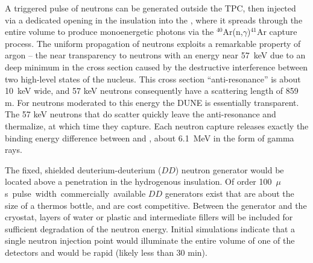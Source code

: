 A triggered pulse of neutrons can be generated outside the TPC, then injected via a dedicated opening in the insulation into the , where it spreads through the entire volume to produce monoenergetic photons via the $^{40}$Ar(n,$\gamma$)$^{41}$Ar capture process. The uniform propagation of neutrons exploits a remarkable property of argon -- the near transparency to neutrons with an energy near \SI{57}{\keV} due to an deep minimum in the cross section caused by the destructive interference between two high-level states of the  nucleus. This cross section ``anti-resonance'' is about \SI{10}{\keV} wide, and 57 keV neutrons consequently have a scattering length of 859 m. For neutrons moderated to this energy the DUNE  is essentially transparent.
The 57 keV neutrons that do scatter quickly leave the anti-resonance and thermalize, at which time they capture. Each neutron capture releases exactly the binding energy difference between  and , about \SI{6.1}{\MeV} in the form of gamma rays.  



The fixed, shielded deuterium-deuterium ($DD$) neutron generator would be located above a penetration in the hydrogenous insulation. Of order \SI{100}{$\mu$s} pulse width commercially available $DD$ generators exist that are about the size of a thermos bottle, and are cost competitive. Between the generator and the cryostat, layers of water or plastic and intermediate fillers will be included for sufficient degradation of the neutron energy. Initial simulations indicate that a single neutron injection point would illuminate the entire volume of one of the  detectors and would be rapid (likely less than 30 min). 

